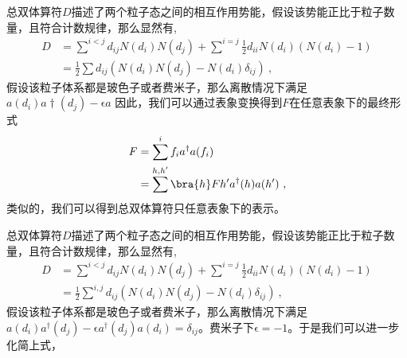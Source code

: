 总双体算符$D$描述了两个粒子态之间的相互作用势能，假设该势能正比于粒子数量，且符合计数规律，那么显然有,
\begin{equation}
\begin{aligned}
D&=\sum^{i<j}d_{ij}N(d_i)N(d_j)+\sum^{i=j}\frac{1}{2}d_{ii}N(d_i)(N(d_i)-1)\\
&=\frac{1}{2}\sum d_{ij}(N(d_i)N(d_j)-N(d_i)\delta_{ij})~,
\end{aligned}
\end{equation}
假设该粒子体系都是玻色子或者费米子，那么离散情况下满足$a(d_i)a\dagger(d_j)-\mathrm{\epsilon}a$
因此，我们可以通过表象变换得到$F$在任意表象下的最终形式
\begin{equation}
\begin{aligned}
F&=\sum^i f_i a^\dagger a(f_i)\\
&=\sum^{h,h'}\bra{h}F{h'}a^\dagger(h)a(h')~,
\end{aligned}
\end{equation}
类似的，我们可以得到总双体算符只任意表象下的表示。

总双体算符$D$描述了两个粒子态之间的相互作用势能，假设该势能正比于粒子数量，且符合计数规律，那么显然有,
\begin{equation}
\begin{aligned}
D&=\sum^{i<j}d_{ij}N(d_i)N(d_j)+\sum^{i=j}\frac{1}{2}d_{ii}N(d_i)(N(d_i)-1)\\
&=\frac{1}{2}\sum^{i,j} d_{ij}(N(d_i)N(d_j)-N(d_i)\delta_{ij})~,
\end{aligned}
\end{equation}
假设该粒子体系都是玻色子或者费米子，那么离散情况下满足$a(d_i)a^{\dagger}(d_j)-\mathrm{\epsilon}a^{\dagger}(d_j)a(d_i)=\delta_{ij}$。费米子下$\mathrm{\epsilon}=-1$。于是我们可以进一步化简上式，





